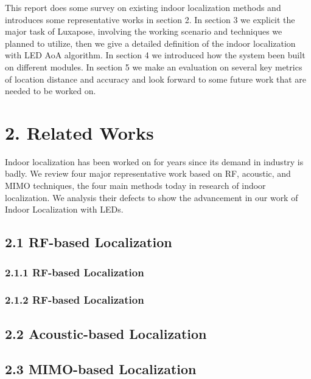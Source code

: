 \documentclass[a4paper, 11pt]{article} %
\begin{document}
 

This report does some survey on existing indoor localization methods and introduces some representative works in section 2. In section 3 we explicit the major task of Luxapose, involving the working scenario and techniques we planned to utilize, then we give a detailed definition of the indoor localization with LED AoA algorithm. In section 4 we introduced how the system been built on different modules. In section 5 we make an evaluation on several key metrics of location distance and accuracy and look forward to some future work that are needed to be worked on.


\section*{2. Related Works}
Indoor localization has been worked on for years since its demand in industry is badly. We review four major representative work based on RF, acoustic, and MIMO techniques, the four main methods today in research of indoor localization. We analysis their defects to show the advancement in our work of Indoor Localization with LEDs.

\subsection*{2.1 RF-based Localization \cite{Radar00} \cite{Centaur12}}
\subsubsection*{2.1.1 RF-based Localization \cite{Radar00} \cite{Centaur12}}
\subsubsection*{2.1.2 RF-based Localization \cite{Radar00} \cite{Centaur12}}

\subsection*{2.2 Acoustic-based Localization \cite{Cricket04}}

\subsection*{2.3 MIMO-based Localization \cite{Ubicarse14}}
\end{document}
